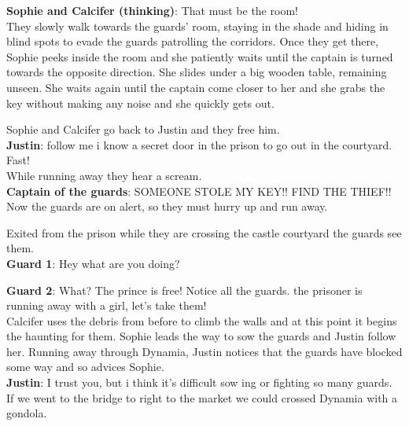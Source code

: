 \textbf{Sophie and Calcifer (thinking)}: That must be the room!\\

\noindent They slowly walk towards the guards’ room, staying in the shade and hiding in blind spots to evade the guards patrolling the corridors. Once they get there, Sophie peeks inside the room and she patiently waits until the captain is turned towards the opposite direction. She slides under a big wooden table, remaining unseen. She waits again until the captain come closer to her and she grabs the key without making any noise and she quickly gets out.

Sophie and Calcifer go back to Justin and they free him.\\

\textbf{Justin}: follow me i know a secret door in the prison to go out in the courtyard. Fast! \\

\noindent While running away they hear a scream.\\

\textbf{Captain of the guards}: SOMEONE STOLE MY KEY!! FIND THE THIEF!!\\

\noindent Now the guards are on alert, so they must hurry up and run away.

Exited from the prison while they are crossing the castle courtyard the guards see them.\\

\textbf{Guard 1}: Hey what are you doing?

\textbf{Guard 2}: What? The prince is free! Notice all the guards. the prisoner is running away with a girl, let's take them!\\

\noindent Calcifer uses the debris from before to climb the walls and at this point it begins the haunting for them.
Sophie leads the way to sow the guards and Justin follow her. Running away through Dynamia, Justin notices that the guards have blocked some way and so advices Sophie.\\

\textbf{Justin}: I trust you, but i think it's difficult sow ing or fighting so many guards.
If we went to the bridge to right to the market we could crossed Dynamia with a gondola. 

